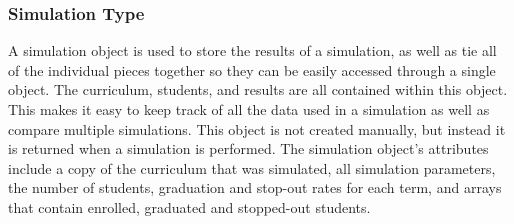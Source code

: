 \documentclass[botnum, fleqn]{unmeethesis}
\begin{document}

        


      \subsubsection{Simulation Type}
        A simulation object is used to store the results of a simulation, as well as tie all of the individual pieces together so they can be easily accessed through a single object. The curriculum, students, and results are all contained within this object. This makes it easy to keep track of all the data used in a simulation as well as compare multiple simulations. This object is not created manually, but instead it is returned when a simulation is performed. The simulation object's attributes include a copy of the curriculum that was simulated, all simulation parameters, the number of students, graduation and stop-out rates for each term, and arrays that contain enrolled, graduated and stopped-out students.

\end{document}
